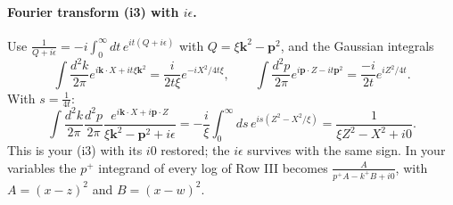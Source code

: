 \documentclass[10pt]{article}
\numberwithin{equation}{section}
\begin{document}
\paragraph{Fourier transform (i3) with $i\epsilon$.} Use $\frac{1}{Q+i\epsilon}=-i\int_0^\infty dt\,e^{it(Q+i\epsilon)}$ with $Q=\xi\mathbf k^2-\mathbf p^2$, and the Gaussian integrals
\begin{equation*}
\int\frac{d^2k}{2\pi}e^{i\mathbf k\cdot X+it\xi\mathbf k^2}=\frac{i}{2t\xi}e^{-iX^2/4t\xi},\qquad
\int\frac{d^2p}{2\pi}e^{i\mathbf p\cdot Z-it\mathbf p^2}=\frac{-i}{2t}e^{iZ^2/4t}.
\end{equation*}
With $s=\frac{1}{4t}$:
\begin{equation}
\int\frac{d^2k}{2\pi}\frac{d^2p}{2\pi}\frac{e^{i\mathbf k\cdot X+i\mathbf p\cdot Z}}{\xi\mathbf k^2-\mathbf p^2+i\epsilon}=-\frac{i}{\xi}\int_0^\infty ds\,e^{is(Z^2-X^2/\xi)}=\frac{1}{\xi Z^2-X^2+i0}.
\end{equation}
This is your (i3) with its $i0$ restored; the $i\epsilon$ survives with the same sign. In your variables the $p^+$ integrand of every log of Row III becomes $\frac{A}{p^+A-k^+B+i0}$, with $A=(x-z)^2$ and $B=(x-w)^2$.
\end{document}
